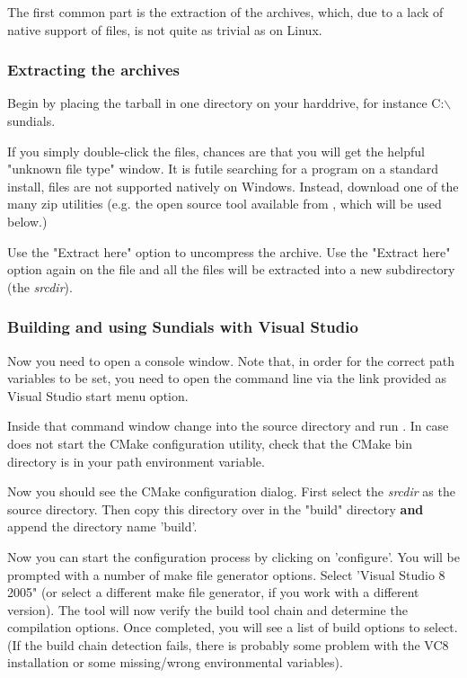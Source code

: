The first common part is the extraction of the archives, which, due to a lack of native 
support of  files, is not quite as trivial as on Linux. 

\subsubsection*{Extracting the archives}

Begin by placing the {\sundials} tarball in one directory on your harddrive, for instance 
C:$\backslash$sundials.


If you simply double-click the files, chances are that you will get the helpful 
"unknown file type" window. It is futile searching for a program on a standard install, 
 files are not supported natively on Windows. Instead, download one of 
the many zip utilities (e.g. the open source tool  available from
, which will be used below.)

Use the "Extract here" option to uncompress the  archive.
Use the "Extract here" option again on the  file and all 
the files will be extracted into a new  subdirectory (the {\em srcdir}).

\subsubsection*{Building and using Sundials with Visual Studio}

Now you need to open a console window. 
Note that, in order for the correct path variables to be set, you need to open the command 
line via the link provided as Visual Studio start menu option.

Inside that command window change into the source directory and run . 
In case  does not start the CMake configuration utility, 
check that the CMake bin directory is in your path environment variable.

Now you should see the CMake configuration dialog. First select the {\em srcdir} 
as the source directory. Then copy this directory over in the "build" directory 
{\bf and} append the directory name 'build'.

Now you can start the configuration process by clicking on 'configure'. 
You will be prompted with a number of make file generator options.
Select 'Visual Studio 8 2005" (or select a different make file generator, 
if you work with a different version). The  tool will now verify 
the build tool chain and determine the compilation options. 
Once completed, you will see a list of build options to select. 
(If the build chain detection fails, there is probably some problem with the 
VC8 installation or some missing/wrong environmental variables).

